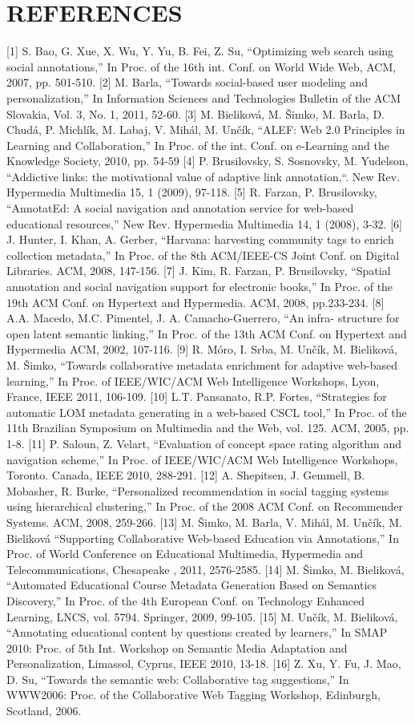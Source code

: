 \documentclass{llncs}
\begin{document}
\section{REFERENCES}
%  
[1] S. Bao, G. Xue, X. Wu, Y. Yu, B. Fei, Z. Su, “Optimizing web search using social annotations,” In Proc. of the 16th int. Conf. on World Wide Web, ACM, 2007, pp. 501-510.
[2] M. Barla, “Towards social-based user modeling and personalization,” In Information Sciences and Technologies Bulletin of the ACM Slovakia, Vol. 3, No. 1, 2011, 52-60. 
[3] M. Bieliková, M. Šimko, M. Barla, D. Chudá, P. Michlík, M. Labaj, V. Mihál, M. Unčík, “ALEF: Web 2.0 Principles in Learning and Collaboration,” In Proc. of the int. Conf. on e-Learning and the Knowledge Society, 2010, pp. 54-59 
[4] P. Brusilovsky, S. Sosnovsky, M. Yudelson, “Addictive links: the motivational value of adaptive link annotation,“. New Rev. Hypermedia Multimedia 15, 1 (2009), 97-118. [5] R. Farzan, P. Brusilovsky, “AnnotatEd: A social navigation and annotation service for web-based educational resources,” New Rev. Hypermedia Multimedia 14, 1 (2008), 3-32. [6] J. Hunter, I. Khan, A. Gerber, “Harvana: harvesting community tags to enrich collection metadata,” In Proc. of the 8th ACM/IEEE-CS Joint Conf. on Digital Libraries. ACM, 2008, 147-156. [7] J. Kim, R. Farzan, P. Brusilovsky, “Spatial annotation and social navigation support for electronic books,” In Proc. of the 19th ACM Conf. on Hypertext and Hypermedia. ACM, 2008, pp.233-234. [8] A.A. Macedo, M.C. Pimentel, J. A. Camacho-Guerrero, “An infra- structure for open latent semantic linking,” In Proc. of the 13th ACM Conf. on Hypertext and Hypermedia ACM, 2002, 107-116. [9] R. Móro, I. Srba, M. Unčík, M. Bieliková, M. Šimko, “Towards collaborative metadata enrichment for adaptive web-based learning,” In Proc. of IEEE/WIC/ACM Web Intelligence Workshops, Lyon, France, IEEE 2011, 106-109. [10] L.T. Pansanato, R.P. Fortes, “Strategies for automatic LOM metadata generating in a web-based CSCL tool,” In Proc. of the 11th Brazilian Symposium on Multimedia and the Web, vol. 125. ACM, 2005, pp. 1-8. [11] P. Saloun, Z. Velart, “Evaluation of concept space rating algorithm and navigation scheme,” In Proc. of IEEE/WIC/ACM Web Intelligence Workshops, Toronto. Canada, IEEE 2010, 288-291. [12] A. Shepitsen, J. Gemmell, B. Mobasher, R. Burke, “Personalized recommendation in social tagging systems using hierarchical clustering,” In Proc. of the 2008 ACM Conf. on Recommender Systems. ACM, 2008, 259-266. [13] M. Šimko, M. Barla, V. Mihál, M. Unčík, M. Bieliková “Supporting Collaborative Web-based Education via Annotations,” In Proc. of World Conference on Educational Multimedia, Hypermedia and Telecommunications, Chesapeake , 2011, 2576-2585. [14] M. Šimko, M. Bieliková, “Automated Educational Course Metadata Generation Based on Semantics Discovery,” In Proc. of the 4th European Conf. on Technology Enhanced Learning, LNCS, vol. 5794. Springer, 2009, 99-105. [15] M. Unčík, M. Bieliková, “Annotating educational content by questions created by learners,” In SMAP 2010: Proc. of 5th Int. Workshop on Semantic Media Adaptation and Personalization, Limassol, Cyprus, IEEE 2010, 13-18. [16] Z. Xu, Y. Fu, J. Mao, D. Su, “Towards the semantic web: Collaborative tag suggestions,” In WWW2006: Proc. of the Collaborative Web Tagging Workshop, Edinburgh, Scotland, 2006. 
\end{document}
